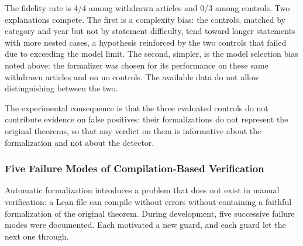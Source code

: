 The fidelity rate is 4/4 among withdrawn articles and 0/3 among controls. Two explanations compete. The first is a complexity bias: the controls, matched by category and year but not by statement difficulty, tend toward longer statements with more nested cases, a hypothesis reinforced by the two controls that failed due to exceeding the model limit. The second, simpler, is the model selection bias noted above: the formalizer was chosen for its performance on these same withdrawn articles and on no controls. The available data do not allow distinguishing between the two.

The experimental consequence is that the three evaluated controls do not contribute evidence on false positives: their formalizations do not represent the original theorems, so that any verdict on them is informative about the formalization and not about the detector.

\subsubsection{Five Failure Modes of Compilation-Based Verification}
\label{ssec:modosfalla}

Automatic formalization introduces a problem that does not exist in manual verification: a Lean file can compile without errors without containing a faithful formalization of the original theorem. During development, five successive failure modes were documented. Each motivated a new guard, and each guard let the next one through.

